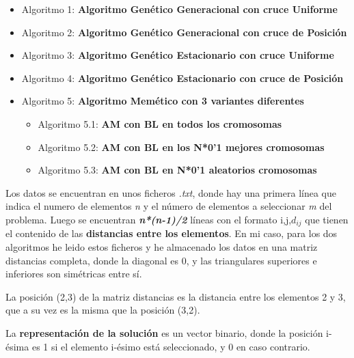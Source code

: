 \documentclass{article}
\begin{document}
\begin{itemize}
\item Algoritmo 1: \textbf{Algoritmo Genético Generacional con cruce Uniforme}
\item Algoritmo 2: \textbf{Algoritmo Genético Generacional con cruce de Posición}
\item Algoritmo 3: \textbf{Algoritmo Genético Estacionario con cruce Uniforme}
\item Algoritmo 4: \textbf{Algoritmo Genético Estacionario con cruce de Posición}
\item Algoritmo 5: \textbf{Algoritmo Memético con 3 variantes diferentes}
\begin{itemize}
\item Algoritmo 5.1: \textbf{AM con BL en todos los cromosomas}
\item Algoritmo 5.2: \textbf{AM con BL en los N*0'1 mejores cromosomas}
\item Algoritmo 5.3: \textbf{AM con BL en N*0'1 aleatorios cromosomas}
\end{itemize}

\end{itemize}

\vspace{5mm}

Los datos se encuentran en unos ficheros \emph{.txt}, donde hay una primera línea 
que indica el numero de elementos \emph{n} y el número de elementos a seleccionar
\emph{m} del problema.
\newline Luego se encuentran \textbf{\emph{n*(n-1)/2}} líneas con el formato i,j,$d_{ij}$ que
tienen el contenido de las \textbf{distancias entre los elementos}.
\newline En mi caso, para los dos algoritmos he leido estos ficheros
y he almacenado los datos en una matriz distancias completa, donde la diagonal es 0,
y las triangulares superiores e inferiores son simétricas entre sí.

\vspace{5mm}

La posición (2,3) de la matriz distancias es la distancia entre los elementos 2 y 3,
que a su vez es la misma que la posición (3,2).

\vspace{5mm}

La \textbf{representación de la solución} es un vector binario, donde la posición i-ésima
es 1 si el elemento i-ésimo está seleccionado, y 0 en caso contrario.

\vspace{5mm}
\end{document}
